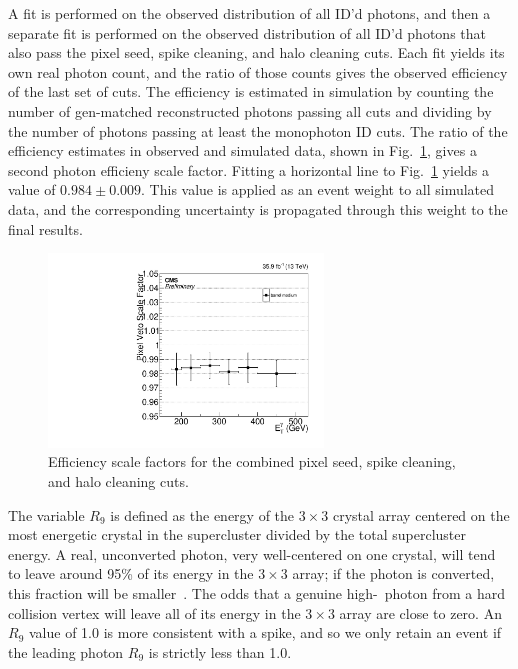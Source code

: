 A fit is performed on the observed distribution of all ID'd photons, and then a separate fit is performed on the observed distribution of
all ID'd photons that also pass the pixel seed, spike cleaning, and halo cleaning cuts. Each fit yields its own real photon count, and the ratio of those counts gives the observed efficiency
of the last set of cuts. The efficiency is estimated in simulation by counting the number of gen-matched reconstructed photons passing all cuts and
dividing by the number of photons passing at least the monophoton ID cuts. The ratio of the efficiency estimates in observed and simulated data, shown in Fig.~\ref{fig:pixseed_SF},
gives a second photon efficieny scale factor. Fitting a horizontal line to Fig.~\ref{fig:pixseed_SF} yields a value of $0.984 \pm 0.009$. This value is applied
as an event weight to all simulated data, and the corresponding uncertainty is propagated through this weight to the final results.

\begin{figure}[hbtp]
  \begin{center}
    \includegraphics[width=0.65\textwidth]{Figures/pixseed_SF.pdf}
    \caption{
    Efficiency scale factors for the combined pixel seed, spike cleaning, and halo cleaning cuts.
    }
    \label{fig:pixseed_SF}
  \end{center}
\end{figure}

The variable $R_{9}$ is defined as the energy of the $3{\times}3$ crystal array centered on the most energetic crystal in the supercluster divided by the total supercluster energy.
A real, unconverted photon, very well-centered on one crystal, will tend to leave around 95\% of its energy in the $3{\times}3$ array; if the photon is converted, this fraction will
be smaller~\cite{ref:1748-0221/10/08/P08010}. The odds that a genuine high-\pT\ photon from a hard collision vertex will leave all of its energy in the $3{\times}3$ array
are close to zero. An $R_{9}$ value of 1.0 is more consistent with a spike, and so we only retain an event if the leading photon $R_{9}$ is strictly less than 1.0.

